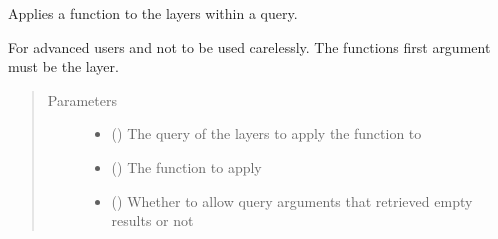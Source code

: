 \documentclass[letterpaper,10pt,english]{sphinxmanual}
\begin{document}
\begin{fulllineitems}

\begin{fulllineitems}
\label{\detokenize{builder:geohexviz.builder.PlotBuilder.apply_to_query}}
\sphinxAtStartPar
Applies a function to the layers within a query.

\sphinxAtStartPar
For advanced users and not to be used carelessly.
The functions first argument must be the layer.
\begin{quote}\begin{description}
\item[{Parameters}] \leavevmode\begin{itemize}
\item {} 
\sphinxAtStartPar
{} () \textendash{} The query of the layers to apply the function to

\item {} 
\sphinxAtStartPar
{} () \textendash{} The function to apply

\item {} 
\sphinxAtStartPar
{} () \textendash{} Whether to allow query arguments that retrieved empty results or not

\end{itemize}

\end{description}\end{quote}

\end{fulllineitems}



\end{fulllineitems}
\end{document}
